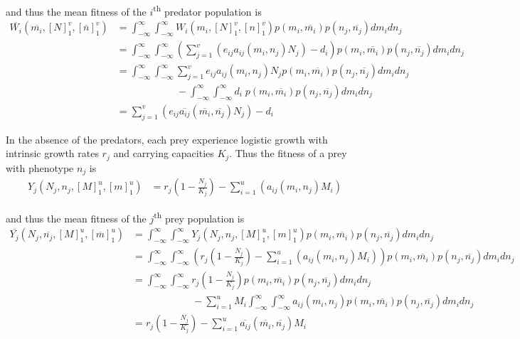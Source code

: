 \documentclass[10pt]{beamer}
\begin{document}
\noindent and thus the mean fitness of the $i$\textsuperscript{th} predator population is
\begin{align*}
	\overline{W_i}(\overline{m_i}, [N]_1^v, [\overline{n}]_1^v) &= \int_{-\infty}^{\infty}\int_{-\infty}^{\infty} W_i(m_i, [N]_1^v, [n]_1^v) p(m_i, \overline{m_i}) p(n_j, \overline{n_j}) dm_i dn_j \\
	&= \int_{-\infty}^{\infty}\int_{-\infty}^{\infty} \left(\sum_{j = 1}^v\left(e_{ij}a_{ij}(m_i, n_j)N_j\right) - d_i\right) p(m_i, \overline{m_i}) p(n_j, \overline{n_j}) dm_i dn_j \\
	&= \int_{-\infty}^{\infty}\int_{-\infty}^{\infty} \sum_{j = 1}^ve_{ij}a_{ij}(m_i, n_j)N_jp(m_i, \overline{m_i}) p(n_j, \overline{n_j}) dm_i dn_j \\
	&\qquad\qquad\qquad- \int_{-\infty}^{\infty}\int_{-\infty}^{\infty} d_i \;p(m_i, \overline{m_i}) p(n_j, \overline{n_j}) dm_i dn_j \\
	&= \sum_{j=1}^v\left(e_{ij}\overline{a_{ij}}(\overline{m_i}, \overline{n_j})N_j\right) - d_i
\end{align*}

\noindent In the absence of the predators, each prey experience logistic growth with intrinsic growth rates $r_j$ and carrying capacities $K_j$.  Thus the fitness of a prey with phenotype $n_j$ is
\begin{align*}
	Y_j(N_j, n_j, [M]_1^u, [m]_1^u) &= r_j\left(1 - \frac{N_j}{K_j} \right) - \sum_{i = 1}^u\left(a_{ij}(m_i, n_j)M_i\right)
\end{align*}

\noindent and thus the mean fitness of the $j$\textsuperscript{th} prey population is
\begin{align*}
	\overline{Y_j}(N_j, \overline{n_j}, [M]_1^u, [\overline{m}]_1^u) &= \int_{-\infty}^{\infty}\int_{-\infty}^{\infty} Y_j(N_j, n_j, [M]_1^u, [m]_1^u) p(m_i, \overline{m_i}) p(n_j, \overline{n_j}) dm_i dn_j \\
	&= \int_{-\infty}^{\infty}\int_{-\infty}^{\infty} \left(r_j\left(1 - \frac{N_j}{K_j} \right) - \sum_{i = 1}^u\left(a_{ij}(m_i, n_j)M_i\right)\right) p(m_i, \overline{m_i}) p(n_j, \overline{n_j}) dm_i dn_j \\
	&= \int_{-\infty}^{\infty}\int_{-\infty}^{\infty} r_j\left(1 - \frac{N_j}{K_j} \right) p(m_i, \overline{m_i}) p(n_j, \overline{n_j}) dm_i dn_j \\
	&\qquad\qquad\qquad - \sum_{i = 1}^u M_i \int_{-\infty}^{\infty}\int_{-\infty}^{\infty} a_{ij}(m_i, n_j) p(m_i, \overline{m_i}) p(n_j, \overline{n_j}) dm_i dn_j \\
	&= r_j \left(1 - \frac{N_j}{K_j} \right) - \sum_{i = 1}^u \overline{a_{ij}}(\overline{m_i}, \overline{n_j}) M_i
\end{align*}
\end{document}
